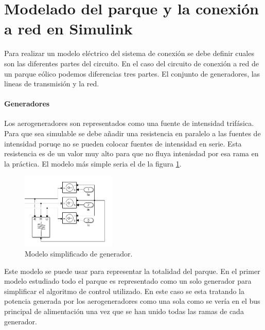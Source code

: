 \documentclass{book}
\begin{document}
	\section{Modelado del parque y la conexi\'on a red en Simulink}

Para realizar un modelo el\'ectrico del sistema de conexi\'on se debe definir cuales son las diferentes partes del circuito. En el caso del circuito de conexi\'on a red de un parque e\'olico podemos diferencias tres partes. El conjunto de generadores, las lineas de transmisi\'on y la red. \par 

		\paragraph{Generadores}

Los aerogeneradores son representados como una fuente de intensidad trif\'asica. Para que sea simulable se debe añadir una resistencia en paralelo a las fuentes de intensidad poruqe no se pueden colocar fuentes de intensidad en serie. Esta resistencia es de un valor muy alto para que no fluya intenisdad por esa rama en la pr\'actica. El modelo más simple seria el de la figura \ref{SimpleGenerator}. \par

\begin{figure}[h!]
\centering
\includegraphics[width=0.4\textwidth]{SimpleGenerator.PNG}
\caption{Modelo simplificado de generador. }
\label{SimpleGenerator}
\end{figure} \par

Este modelo se puede usar para representar la totalidad del parque. En el primer modelo estudiado todo el parque es representado como un solo generador para simplificar el algoritmo de control utilizado. En este caso se esta tratando la potencia generada por los aerogeneradores como una sola como se ver\'ia en el bus principal de alimentaci\'on una vez que se han unido todas las ramas de cada generador. \par
\end{document}
